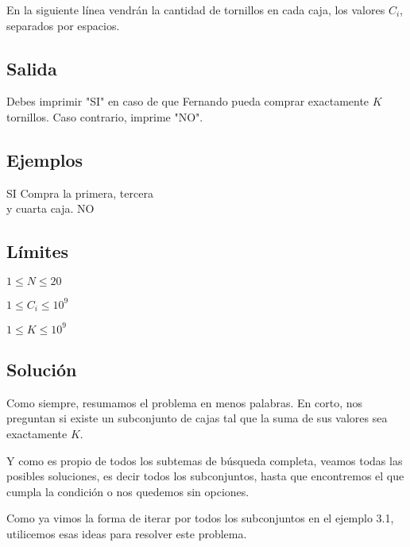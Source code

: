 En la siguiente línea vendrán la cantidad de tornillos en cada caja, los valores \(C_i\), separados por espacios.

\subsection*{Salida}
Debes imprimir "SI" en caso de que Fernando pueda comprar exactamente \(K\) tornillos. Caso contrario, imprime "NO".

\subsection*{Ejemplos}
\begin{casebox3}
	{SI}
	{
		Compra la primera, tercera\\
		y cuarta caja.
	}
	{NO}
	{}
\end{casebox3}
\subsection*{Límites}
\begin{plimits}
	\item \(1\leq N\leq 20 \)
	\item \(1\leq C_i\leq 10^9 \)
	\item \(1\leq K\leq 10^9 \)
\end{plimits}

\subsection*{Solución}
Como siempre, resumamos el problema en menos palabras. En corto, nos preguntan si existe un subconjunto de cajas tal que la suma de sus valores sea exactamente \(K\).

Y como es propio de todos los subtemas de búsqueda completa, veamos todas las posibles soluciones, es decir todos los subconjuntos, hasta que encontremos el que cumpla la condición o nos quedemos sin opciones.

Como ya vimos la forma de iterar por todos los subconjuntos en el ejemplo 3.1, utilicemos esas ideas para resolver este problema.

